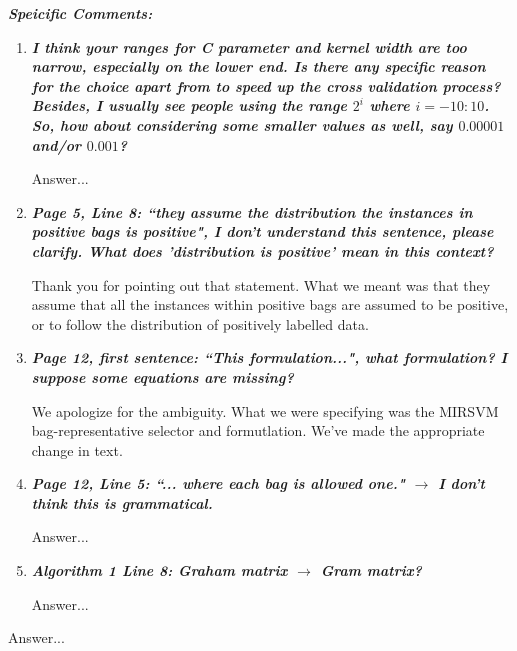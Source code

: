 \documentclass[a4paper,notitlepage]{article}
\begin{document}
\noindent \textbf{\textit{Speicific Comments:}}
\begin{enumerate}
\item \textbf{\textit{I think your ranges for C parameter and kernel width are too narrow, especially on the lower end. Is there any specific reason for the choice apart from to speed up the cross validation process? Besides, I usually see people using the range $2^i$ where $i = -10:10$. So, how about considering some smaller values as well, say $0.00001$ and/or $0.001$?}}

\medskip

\noindent Answer...

\item \textbf{\textit{Page 5, Line 8: ``they assume the distribution the instances in positive bags is positive", I don't understand this sentence, please clarify. What does 'distribution is positive' mean in this context?}}

\medskip

\noindent Thank you for pointing out that statement. What we meant was that they assume that all the instances within positive bags are assumed to be positive, or to follow the distribution of positively labelled data.

\item \textbf{\textit{Page 12, first sentence: ``This formulation...", what formulation? I suppose some equations are missing?}}

\medskip

\noindent We apologize for the ambiguity. What we were specifying was the MIRSVM bag-representative selector and formutlation. We've made the appropriate change in text. 

\item \textbf{\textit{Page 12, Line 5: ``... where each bag is allowed one." $\rightarrow$ I don't think this is grammatical.}}

\medskip

\noindent Answer...

\item \textbf{\textit{Algorithm 1 Line 8: Graham matrix $\rightarrow$ Gram matrix?}}

\medskip

\noindent Answer...

\end{enumerate}

\medskip

\noindent Answer...
\end{document}
